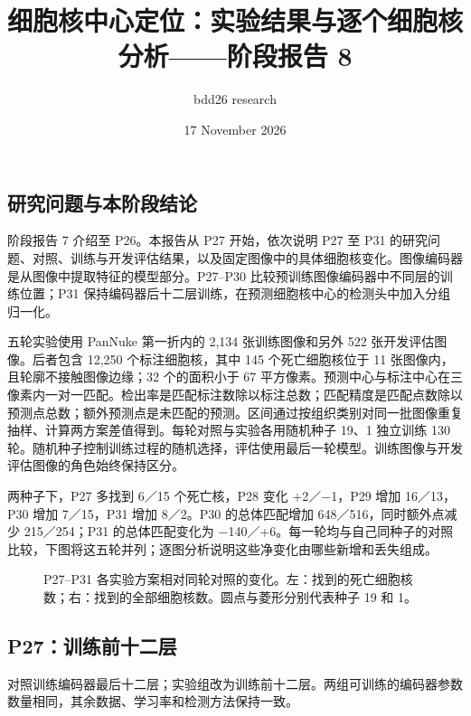 \documentclass[
  11pt,
  fontset=fandol]{ctexart}
\title{细胞核中心定位：实验结果与逐个细胞核分析------阶段报告 8}
\author{bdd26 research}
\date{17 November 2026}
\begin{document}
\maketitle

{
\setcounter{tocdepth}{2}
\tableofcontents
\newpage
}
\subsection{研究问题与本阶段结论}\label{ux7814ux7a76ux95eeux9898ux4e0eux672cux9636ux6bb5ux7ed3ux8bba}

阶段报告 7 介绍至 P26。本报告从 P27 开始，依次说明 P27 至 P31
的研究问题、对照、训练与开发评估结果，以及固定图像中的具体细胞核变化。图像编码器是从图像中提取特征的模型部分。P27--P30
比较预训练图像编码器中不同层的训练位置；P31
保持编码器后十二层训练，在预测细胞核中心的检测头中加入分组归一化。

五轮实验使用 PanNuke 第一折内的 2,134 张训练图像和另外 522
张开发评估图像。后者包含 12,250 个标注细胞核，其中 145 个死亡细胞核位于
11 张图像内，且轮廓不接触图像边缘；32 个的面积小于 67
平方像素。预测中心与标注中心在三像素内一对一匹配。检出率是匹配标注数除以标注总数；匹配精度是匹配点数除以预测点总数；额外预测点是未匹配的预测。区间通过按组织类别对同一批图像重复抽样、计算两方案差值得到。每轮对照与实验各用随机种子
19、1 独立训练 130
轮。随机种子控制训练过程的随机选择，评估使用最后一轮模型。训练图像与开发评估图像的角色始终保持区分。

两种子下，P27 多找到 6／15 个死亡核，P28 变化 +2／−1，P29 增加
16／13，P30 增加 7／15，P31 增加 8／2。P30 的总体匹配增加
648／516，同时额外点减少 215／254；P31 的总体匹配变化为
−140／+6。每一轮均与自己同种子的对照比较，下图将这五轮并列；逐图分析说明这些净变化由哪些新增和丢失组成。

\begin{figure}[H]\centering\caption{P27–P31 各实验方案相对同轮对照的变化。左：找到的死亡细胞核数；右：找到的全部细胞核数。圆点与菱形分别代表种子 19 和 1。}\end{figure}

\subsection{P27：训练前十二层}\label{p27ux8badux7ec3ux524dux5341ux4e8cux5c42}

对照训练编码器最后十二层；实验组改为训练前十二层。两组可训练的编码器参数数量相同，其余数据、学习率和检测方法保持一致。
\end{document}

